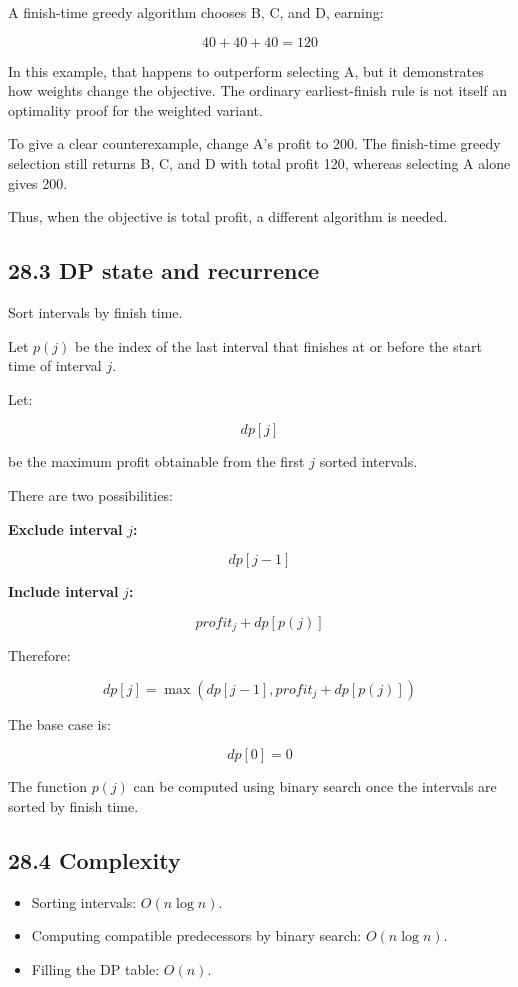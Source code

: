 A finish-time greedy algorithm chooses B, C, and D, earning:


\[
40+40+40=120
\]


In this example, that happens to outperform selecting A, but it demonstrates how weights change the objective. The ordinary earliest-finish rule is not itself an optimality proof for the weighted variant.

To give a clear counterexample, change A's profit to 200. The finish-time greedy selection still returns B, C, and D with total profit 120, whereas selecting A alone gives 200.

Thus, when the objective is total profit, a different algorithm is needed.

\subsection{28.3 DP state and recurrence}

Sort intervals by finish time.

Let $p(j)$ be the index of the last interval that finishes at or before the start time of interval $j$.

Let:


\[
dp[j]
\]


be the maximum profit obtainable from the first $j$ sorted intervals.

There are two possibilities:

\textbf{Exclude interval }$j$\textbf{:}


\[
dp[j-1]
\]


\textbf{Include interval }$j$\textbf{:}


\[
profit_j+dp[p(j)]
\]


Therefore:


\[
\boxed{ dp[j]=\max(dp[j-1],profit_j+dp[p(j)]) }
\]


The base case is:


\[
dp[0]=0
\]


The function $p(j)$ can be computed using binary search once the intervals are sorted by finish time.

\subsection{28.4 Complexity}

\begin{itemize}
    \item Sorting intervals: $O(n\log n)$.
    \item Computing compatible predecessors by binary search: $O(n\log n)$.
    \item Filling the DP table: $O(n)$.
\end{itemize}

